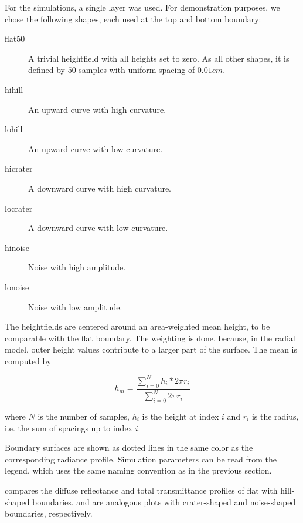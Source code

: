 \documentclass[]{article}
\begin{document}
For the simulations, a single layer was used. For demonstration purposes, we chose the following shapes, each used at the top and bottom boundary:

\begin{description}
	\item[flat50] A trivial heightfield with all heights set to zero. As all other shapes, it is defined by $50$ samples with uniform spacing of $0.01cm$.
	\item[hihill] An upward curve with high curvature.
	\item[lohill] An upward curve with low curvature.
	\item[hicrater] A downward curve with high curvature.
	\item[locrater] A downward curve with low curvature.
	\item[hinoise] Noise with high amplitude.
	\item[lonoise] Noise with low amplitude.
\end{description}

The heightfields are centered around an area-weighted mean height, to be comparable with the flat boundary. The weighting is done, because, in the radial model, outer height values contribute to a larger part of the surface. The mean is computed by

\begin{equation}
	h_m = \frac{\sum_{i=0}^{N}h_i * 2\pi r_i}{\sum_{i=0}^{N}2\pi r_i}
\end{equation}

where $N$ is the number of samples, $h_i$ is the height at index $i$ and $r_i$ is the radius, i.e. the sum of spacings up to index $i$.

Boundary surfaces are shown as dotted lines in the same color as the corresponding radiance profile. Simulation parameters can be read from the legend, which uses the same naming convention as in the previous section.

 compares the diffuse reflectance and total transmittance profiles of flat with hill-shaped boundaries.  and  are analogous plots with crater-shaped and noise-shaped boundaries, respectively.
\end{document}
